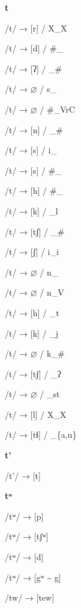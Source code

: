 \begin{center}\textbf{t}\end{center}
\begin{multicols}{4}
\noindent /t/ → [r] / X\_X

\noindent /t/ → [d] / \#\_

\noindent /t/ → [ʔ] / \_\#

\noindent /t/ → $\varnothing$ / s\_

\noindent /t/ → $\varnothing$ / \#\_VrC

\noindent /t/ → [n] / \_\#

\noindent /t/ → [s] / i\_

\noindent /t/ → [s] / \#\_

\noindent /t/ → [h] / \#\_

\noindent /t/ → [k] / \_l

\noindent /t/ → [tʃ] / \_\#

\noindent /t/ → [ʃ] / i\_i

\noindent /t/ → $\varnothing$ / n\_

\noindent /t/ → $\varnothing$ / n\_V

\noindent /t/ → [h] / \_t

\noindent /t/ → [k] / \_j

\noindent /t/ → $\varnothing$ / k\_\#

\noindent /t/ → [tʃ] / \_ʔ

\noindent /t/ → $\varnothing$ / \_st

\noindent /t/ → [l] / X\_X

\noindent /t/ → [tɬ] / \_\{a,u\}

\end{multicols}

\begin{center}\textbf{t'}\end{center}
\begin{multicols}{4}
\noindent /t'/ → [t]

\end{multicols}

\begin{center}\textbf{tʷ}\end{center}
\begin{multicols}{4}
\noindent /tʷ/ → [p]

\noindent /tʷ/ → [tʃʷ]

\noindent /tʷ/ → [d]

\noindent /tʷ/ → [gʷ \textasciitilde{} g]

\noindent /tw/ → [tew]
\end{multicols}

